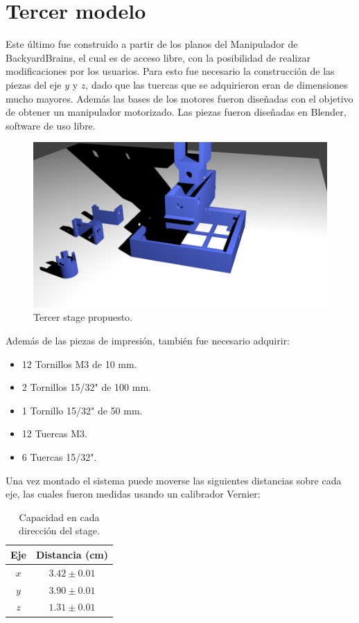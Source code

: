 \section{Tercer modelo}
Este último fue construido a partir de los planos del Manipulador de BackyardBrains, el cual es de acceso libre, con la posibilidad de realizar modificaciones por los usuarios. Para esto fue necesario la construcción de las piezas del eje $y$ y $z$, dado que las tuercas que se adquirieron eran de dimensiones mucho mayores. Además las bases de los motores fueron diseñadas con el objetivo de obtener un manipulador motorizado. Las piezas fueron diseñadas en Blender, software de uso libre.
\begin{figure}[h]
	\centering
	\includegraphics[width=0.9\linewidth]{figures/model3.png}	
	\caption{Tercer stage propuesto.}
	\label{fig:thirdsystem}
\end{figure}

Además de las piezas de impresión, también fue necesario adquirir:
\begin{itemize}
	\item 12 Tornillos M3 de 10 mm.
	\item 2 Tornillos 15/32" de 100 mm.
	\item 1 Tornillo 15/32" de 50 mm.
	\item 12 Tuercas M3.
	\item 6 Tuercas 15/32".
\end{itemize}

Una vez montado el sistema puede moverse las siguientes distancias sobre cada eje, las cuales fueron medidas usando un calibrador Vernier:
\newpage
\begin{table}[h]
	\centering
	\caption{Capacidad en cada dirección del stage.}
	\begin{tabular}{cc}
		\hline
		\textbf{Eje} & \textbf{Distancia (cm)} \\
		\hline
		$x$ & $3.42 \pm 0.01$ \\
		$y$ & $3.90 \pm 0.01$ \\
		$z$ & $1.31 \pm 0.01$ \\
		\hline		
	\end{tabular}
\end{table}

